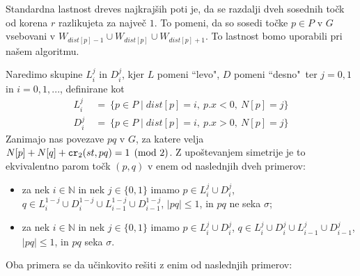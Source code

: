 \documentclass[a4paper, 12pt]{book}
\newcommand{\NN}{\ensuremath{\mathbb N}}  %
\def\dist{\mathit{dist}}
\newcommand\CR{\mbox{\tt cr}_2}		  %
\begin{document}
Standardna lastnost dreves najkrajših poti je, da se razdalji dveh sosednih točk od korena $r$ razlikujeta za največ $1$. To pomeni, da so sosedi točke $p\in P$ v $G$ vsebovani v $W_{\dist[p]-1}\cup W_{\dist[p]} \cup W_{\dist[p]+1}$. To lastnost bomo uporabili pri našem algoritmu.

Naredimo skupine $L_i^j$ in $D_i^j$, kjer $L$ pomeni ``levo", $D$ pomeni ``desno"~ter $j=0,1$ in $i=0,1,...$, definirane kot
\begin{align*}
	L_i^j ~&=~ \{ p\in P \mid \dist[p]=i,~ p.x<0,~ N[p]=j \} \\
	D_i^j ~&=~ \{ p\in P \mid \dist[p]=i,~ p.x>0,~ N[p]=j \}
\end{align*}
Zanimajo nas povezave $pq$ v $G$, za katere velja $N[p]+N[q]+\CR(st,pq)=1 \pmod 2$. Z upoštevanjem simetrije je to ekvivalentno parom točk $(p, q)$ v enem od naslednjih dveh primerov:
\begin{itemize}
	\item za nek $i\in \NN$ in nek $j\in \{0,1\}$ imamo
			$p\in L_i^j\cup D_i^j$, 
			$q\in L_i^{1-j}\cup D_i^{1-j}\cup L_{i-1}^{1-j}\cup D_{i-1}^{1-j}$, 
			$|pq|\le 1$, in $pq$ ne seka $\sigma$;
	\item za nek $i\in \NN$ in nek $j\in \{0,1\}$ imamo
			$p\in L_i^j\cup D_i^j$, 
			$q\in L_i^{j}\cup D_i^{j}\cup L_{i-1}^{j}\cup D_{i-1}^{j}$, 
			$|pq|\le 1$, in $pq$ seka $\sigma$.
\end{itemize}
Oba primera se da učinkovito rešiti z enim od naslednjih primerov:
\end{document}
